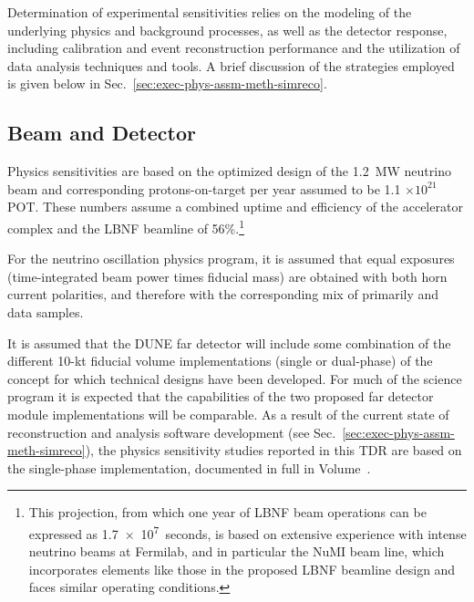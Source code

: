 Determination of experimental sensitivities relies on the
modeling of the underlying physics and background processes,
as well as the detector response, including calibration and
event reconstruction performance and the utilization of data
analysis techniques and tools.
A brief discussion of the strategies employed is given below
in Sec.~\ref{sec:exec-phys-assm-meth-simreco}. 

\subsection{Beam and Detector}
\label{sec:exec-phys-assm-meth-beamdetector}

Physics sensitivities are based on 
the optimized design of the 1.2~MW neutrino beam and
corresponding protons-on-target per year assumed to
be 1.1 $\times 10^{21}$ POT.  These numbers assume a combined
uptime and efficiency of the \fnal accelerator complex and the
LBNF beamline of 56\%.\footnote{This projection, from which one  
year of LBNF beam operations can be expressed as \SI{1.7e7}{seconds}, 
is based on extensive 
experience with intense neutrino beams at Fermilab, and in particular 
the NuMI beam line, which incorporates elements like those in the  
proposed LBNF beamline design and faces similar operating conditions.} 

For the neutrino oscillation physics program, it is assumed that
equal exposures (time-integrated beam power times fiducial mass) are obtained with both horn current polarities,
and therefore with the corresponding mix of primarily \numu
and \anumu data samples.

It is assumed that the DUNE far detector will include some
combination of the different 10-kt fiducial volume
implementations (single or dual-phase) of the \lartpc concept
for which technical designs have been developed.
For much of the science program it is expected that the
capabilities of the two proposed far detector module 
implementations will be comparable.  As a result of the
current state of reconstruction and analysis software development
(see Sec.~\ref{sec:exec-phys-assm-meth-simreco}), the
physics sensitivity studies reported in this TDR are based on
the single-phase \lartpc implementation,
documented in full in Volume~\voltitlesp{}.

